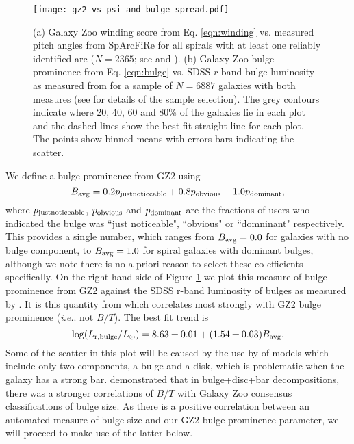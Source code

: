 \documentclass[usenatbib]{mn2e}
\newcommand{\ie}{{\it i.e.}}
\newcommand{\be}{\begin{equation}}
\newcommand{\ee}{\end{equation}}
\begin{document}
\begin{figure*}
\texttt{[image: gz2\_vs\_psi\_and\_bulge\_spread.pdf]}
\caption{(a) Galaxy Zoo winding score from Eq. \ref{eqn:winding} vs. measured pitch angles from SpArcFiRe for all spirals with at least one reliably identified arc ($N=2365$; see \citealt{DavisHayes2014} and \citealt{Hart2017}). (b) Galaxy Zoo bulge prominence from Eq. \ref{eqn:bulge} vs. SDSS $r$-band bulge luminosity as measured from \citet{Simard2011} for a sample of $N=6887$ galaxies with both measures (see  \citealt{Hart2017} for details of the sample selection). The grey contours indicate where 20, 40, 60 and 80\% of the galaxies lie in each plot and the dashed lines show the best fit straight line for each plot. The points show binned means with errors bars indicating the scatter. %
\label{pitch}}
\end{figure*}

We define a bulge prominence from GZ2 using
\be
\label{eqn:bulge}
B_{\rm avg} = 0.2p_{\rm  just noticeable} + 0.8p_{\rm obvious}+ 1.0p_{\rm dominant},
\ee
where $p_{\rm  just noticeable}$, $p_{\rm obvious}$ and $p_{\rm dominant}$ are the fractions of users who indicated the bulge was ``just noticeable", ``obvious" or ``domninant" respectively. This provides a single number, which ranges from $B_{\rm avg} = 0.0$ for galaxies with no bulge component, to $B_{\rm avg} = 1.0$ for spiral galaxies with dominant bulges, although we note there is no a priori reason to select these co-efficients specifically. On the right hand side of Figure \ref{pitch} we plot this measure of bulge prominence from GZ2 against the SDSS r-band luminosity of bulges as measured by \citet{Simard2011}. It is this quantity from \citet{Simard2011} which correlates most strongly with GZ2 bulge prominence (\ie. not $B/T$).  The best fit trend is 
\be 
\log(L_{\rm r,bulge}/L_\odot) = 8.63\pm0.01 + (1.54\pm0.03) B_{\rm avg}.
\ee
Some of the scatter in this plot will be caused by the use by \citet{Simard2011} of models which include only two components, a bulge and a disk, which is problematic when the galaxy has a strong bar. \citet{Kruk2018} demonstrated that in bulge+disc+bar decompositions, there was a stronger correlations of $B/T$ with Galaxy Zoo consensus classifications of bulge size. As there is a positive correlation between an automated measure of bulge size and our GZ2 bulge prominence parameter, we will proceed to make use of the latter below. 
 
\end{document}
